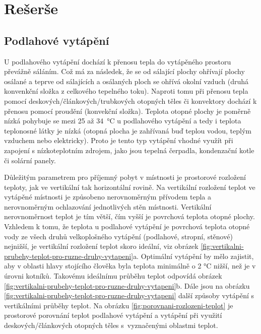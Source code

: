 

\chapter{Rešerše}


\section{Podlahové vytápění}

U podlahového vytápění dochází k přenosu tepla do vytápěného prostoru převážně sáláním. Což má za následek, že se od sálající plochy ohřívají plochy osálané a teprve od sálajících a osálaných ploch se ohřívá okolní vzduch (druhá konvenkční složka z celkového tepelného toku). Naproti tomu při přenosu tepla pomocí deskových/článkových/trubkových otopných těles či konvektory dochází k přenosu pomocí proudění (konvekční složka). 
Teplota otopné plochy je poměrně nízká pohybuje se mezi 25 až 34~°C u podlahového vytápění a tedy i teplota teplonosné látky je nízká (otopná plocha je zahřívaná buď teplou vodou, teplým vzduchem nebo elektricky). Proto je tento typ vytápění vhodné využít při zapojení s nízkoteplotním zdrojem, jako jsou tepelná čerpadla, kondenzační kotle či solární panely.

Důležitým parametrem pro příjemný pobyt v místnosti je prostorové rozložení teploty, jak ve vertikální tak horizontální rovině. Na vertikální rozložení teplot ve vytápěné místnosti je způsobeno nerovnoměrným přívodem tepla a nerovnoměrným ochlazování jednotlivých stěn místnosti. Vertikální nerovnoměrnost teplot je tím větší, čím vyšší je povrchová teplota otopné plochy. Vzhledem k tomu, že teplota u podlahové vytápění je povrchová teplota otopné vody ze všech druhů velkoplošného vytápění (podlahové, stropní, stěnové) nejnižší, je vertikální rozložení teplot skoro ideální, viz obrázek \ref{fig:vertikalni-prubehy-teplot-pro-ruzne-druhy-vytapeni}a. Optimální vytápění by mělo zajistit, aby v oblasti hlavy stojícího člověka byla teplota minimálně o 2 °C nižší, než je v úrovni kotníků. Takovému ideálnímu průběhu teplot odpovídá obrázek \ref{fig:vertikalni-prubehy-teplot-pro-ruzne-druhy-vytapeni}b. Dále jsou na obrázku  \ref{fig:vertikalni-prubehy-teplot-pro-ruzne-druhy-vytapeni} další způsoby vytápění s vertikálními průběhy teplot. Na obrázku \ref{fig:porovnani-rozlozeni-teplot} je prostorové porovnání teplot podlahové vytápění a vytápění při využití deskových/článkových otopných těles s~vyznačenými oblastmi teplot.


